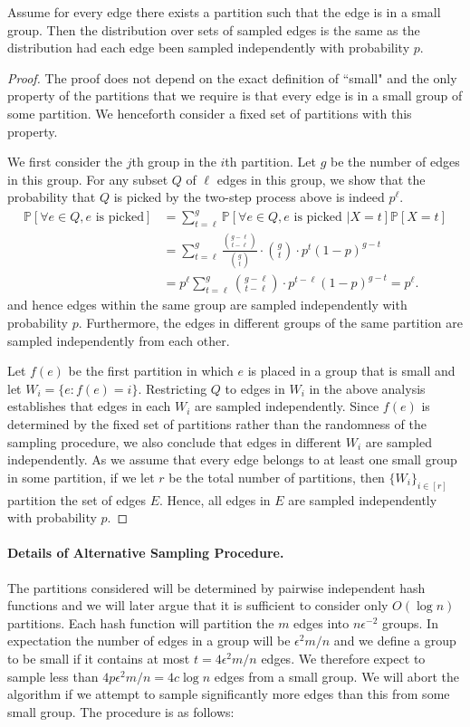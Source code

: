 \documentclass[11pt]{article}
\newcommand{\prob}[1]{\mathbb P \left [ #1 \right ]}
\begin{document}
\begin{lemma}
Assume for every edge there exists a partition such that the edge is in a small group. Then the distribution over sets of sampled edges is the same as the distribution had each edge been sampled independently with probability $p$.
\end{lemma}
\begin{proof}
The proof does not depend on the exact definition of ``small" and the only property of the partitions that we require is that every edge is in a small group of some partition. We henceforth consider a fixed set of partitions with this property.

We first consider the $j$th group in the $i$th partition. Let $g$ be the number of edges in this group. For any subset $Q$ of $\ell$ edges in this group, we show that the probability that $Q$ is picked by the two-step process above is indeed $p^\ell$. 
\begin{align*}
 \prob{ \forall e \in Q, \mbox{$e$ is picked} }   &= \sum_{t=\ell}^g \prob{\forall e \in Q, \mbox{$e$ is picked } | X = t} \prob{X=t} \\
& = \sum_{t = \ell}^g \frac{ { g-\ell \choose t- \ell} } {{g \choose t}} \cdot {g \choose t} \cdot p^t (1-p)^{g-t} \\
& = p^\ell \sum_{t = \ell}^g { g-\ell \choose t- \ell}  \cdot p^{t-\ell} (1-p)^{g-t} = p^\ell.
\end{align*}
and hence  edges within the same group are sampled independently with probability $p$. Furthermore, the edges in different groups of the same partition are sampled independently from each other.
 
Let $f(e)$ be the first partition in which $e$ is placed in a group that is small and let $W_i=\{e:f(e)=i\}$. 
Restricting $Q$ to edges in $W_i$ in the above analysis establishes that edges in each $W_i$ are sampled independently. Since $f(e)$ is determined by the fixed set  of partitions rather than the randomness of the sampling procedure, we also conclude that edges in different $W_i$ are sampled independently.  As we assume that every edge belongs to at least one small group in some partition, if we let $r$ be the total number of partitions, then $\{W_i \}_{i \in [r] }$ partition the set of edges $E$. Hence, all edges in $E$ are sampled independently with probability $p$.
\end{proof}


\paragraph{Details of Alternative Sampling Procedure.}
The partitions considered will be determined by pairwise independent hash functions and we will later argue that it is sufficient to consider only $O(\log n)$ partitions. Each hash function will partition the $m$ edges into $n\epsilon^{-2}$ groups. In expectation the number of edges in a group will be $\epsilon^{2} m/n$ and we define a  group to be small if it contains at most $t=4\epsilon^{2} m/n$ edges. We therefore expect to sample less than  $4p\epsilon^{2} m/n=4c\log n$ edges from a small group. We will abort the algorithm if we attempt to sample significantly more edges than this from some small group. The procedure is as follows:
\end{document}
